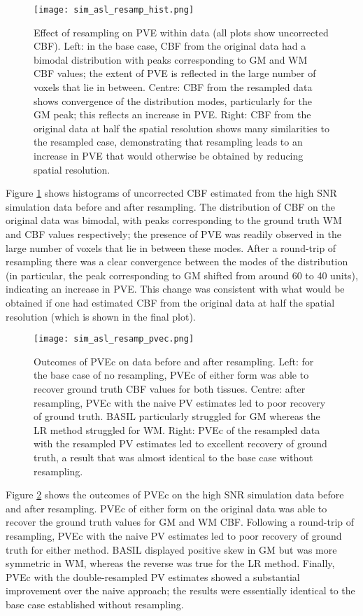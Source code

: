 \begin{figure}[H]
\centering
\texttt{[image: sim\_asl\_resamp\_hist.png]}
\caption{Effect of resampling on PVE within data (all plots show uncorrected CBF). Left: in the base case, CBF from the original data had a bimodal distribution with peaks corresponding to GM and WM CBF values; the extent of PVE is reflected in the large number of voxels that lie in between. Centre: CBF from the resampled data shows convergence of the distribution modes, particularly for the GM peak; this reflects an increase in PVE. Right: CBF from the original data at half the spatial resolution shows many similarities to the resampled case, demonstrating that resampling leads to an increase in PVE that would otherwise be obtained by reducing spatial resolution.}
\label{sim_asl_resamp_hist}
\end{figure}

Figure \ref{sim_asl_resamp_hist} shows histograms of uncorrected CBF estimated from the high SNR simulation data before and after resampling. The distribution of CBF on the original data was bimodal, with peaks corresponding to the ground truth WM and CBF values respectively; the presence of PVE was readily observed in the large number of voxels that lie in between these modes. After a round-trip of resampling there was a clear convergence between the modes of the distribution (in particular, the peak corresponding to GM shifted from around 60 to 40 units), indicating an increase in PVE. This change was consistent with what would be obtained if one had estimated CBF from the original data at half the spatial resolution (which is shown in the final plot). 

\begin{figure}[H]
\centering
\texttt{[image: sim\_asl\_resamp\_pvec.png]}
\caption{Outcomes of PVEc on data before and after resampling. Left: for the base case of no resampling, PVEc of either form was able to recover ground truth CBF values for both tissues. Centre: after resampling, PVEc with the naive PV estimates led to poor recovery of ground truth. BASIL particularly struggled for GM whereas the LR method struggled for WM. Right: PVEc of the resampled data with the resampled PV estimates led to excellent recovery of ground truth, a result that was almost identical to the base case without resampling.}
\label{sim_asl_resamp_pvec}
\end{figure}

Figure \ref{sim_asl_resamp_pvec} shows the outcomes of PVEc on the high SNR simulation data before and after resampling. PVEc of either form on the original data was able to recover the ground truth values for GM and WM CBF. Following a round-trip of resampling, PVEc with the naive PV estimates led to poor recovery of ground truth for either method. BASIL displayed positive skew in GM but was more symmetric in WM, whereas the reverse was true for the LR method. Finally, PVEc with the double-resampled PV estimates showed a substantial improvement over the naive approach; the results were essentially identical to the base case established without resampling. 

